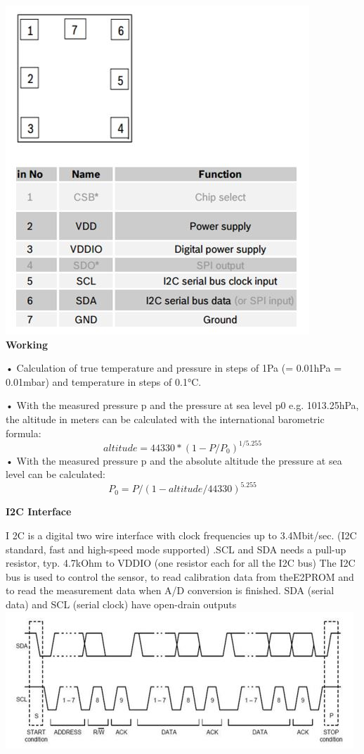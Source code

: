 \documentclass[11pt]{report}
\begin{document}
	 \includegraphics{pinbmp.jpg}
	 \\
	 
	 \textbf{Working}
	 
	 •	Calculation of true temperature and pressure in steps of 1Pa (= 0.01hPa = 0.01mbar) and temperature in steps of 0.1°C.
	 
	 •	With the measured pressure p and the pressure at sea level p0 e.g. 1013.25hPa, the altitude in meters can be calculated with the international barometric formula:
	 $$altitude = 44330*(1-P/P_{0})^{1/5.255}$$
	 •	With the measured pressure p and the absolute altitude the pressure at sea level can be calculated:
	 $$P_{0} = P/(1-altitude/44330)^{5.255}$$
	 
	\textbf{I2C Interface}
	
	 I 2C is a digital two wire interface  with clock frequencies up to 3.4Mbit/sec. (I2C standard, fast and high-speed mode supported) .SCL and SDA needs a pull-up resistor, typ. 4.7kOhm to VDDIO (one resistor each for all the I2C bus) The I2C bus is used to control the sensor, to read calibration data from theE2PROM and to read the measurement data when A/D conversion is finished. SDA (serial data) and SCL (serial clock) have open-drain outputs
	 \\
	 
	 \includegraphics{I2C.jpg}
	 \\
	 
\end{document}
